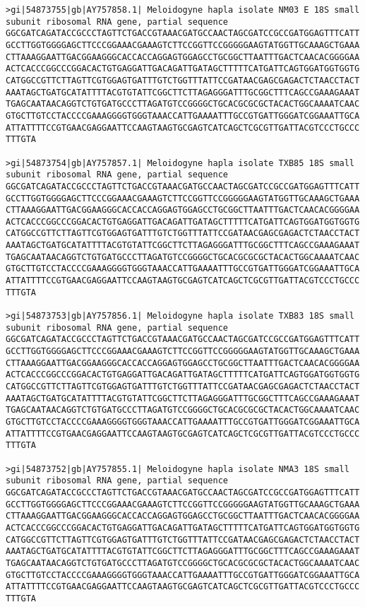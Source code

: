 \documentclass[11pt]{article}
\begin{document}
\begin{Verbatim}[commandchars=\\\{\}]
>gi|54873755|gb|AY757858.1| Meloidogyne hapla isolate NM03 E 18S small subunit ribosomal RNA gene, partial sequence
GGCGATCAGATACCGCCCTAGTTCTGACCGTAAACGATGCCAACTAGCGATCCGCCGATGGAGTTTCATT
GCCTTGGTGGGGAGCTTCCCGGAAACGAAAGTCTTCCGGTTCCGGGGGAAGTATGGTTGCAAAGCTGAAA
CTTAAAGGAATTGACGGAAGGGCACCACCAGGAGTGGAGCCTGCGGCTTAATTTGACTCAACACGGGGAA
ACTCACCCGGCCCGGACACTGTGAGGATTGACAGATTGATAGCTTTTTCATGATTCAGTGGATGGTGGTG
CATGGCCGTTCTTAGTTCGTGGAGTGATTTGTCTGGTTTATTCCGATAACGAGCGAGACTCTAACCTACT
AAATAGCTGATGCATATTTTACGTGTATTCGGCTTCTTAGAGGGATTTGCGGCTTTCAGCCGAAAGAAAT
TGAGCAATAACAGGTCTGTGATGCCCTTAGATGTCCGGGGCTGCACGCGCGCTACACTGGCAAAATCAAC
GTGCTTGTCCTACCCCGAAAGGGGTGGGTAAACCATTGAAAATTTGCCGTGATTGGGATCGGAAATTGCA
ATTATTTTCCGTGAACGAGGAATTCCAAGTAAGTGCGAGTCATCAGCTCGCGTTGATTACGTCCCTGCCC
TTTGTA

>gi|54873754|gb|AY757857.1| Meloidogyne hapla isolate TXB85 18S small subunit ribosomal RNA gene, partial sequence
GGCGATCAGATACCGCCCTAGTTCTGACCGTAAACGATGCCAACTAGCGATCCGCCGATGGAGTTTCATT
GCCTTGGTGGGGAGCTTCCCGGAAACGAAAGTCTTCCGGTTCCGGGGGAAGTATGGTTGCAAAGCTGAAA
CTTAAAGGAATTGACGGAAGGGCACCACCAGGAGTGGAGCCTGCGGCTTAATTTGACTCAACACGGGGAA
ACTCACCCGGCCCGGACACTGTGAGGATTGACAGATTGATAGCTTTTTCATGATTCAGTGGATGGTGGTG
CATGGCCGTTCTTAGTTCGTGGAGTGATTTGTCTGGTTTATTCCGATAACGAGCGAGACTCTAACCTACT
AAATAGCTGATGCATATTTTACGTGTATTCGGCTTCTTAGAGGGATTTGCGGCTTTCAGCCGAAAGAAAT
TGAGCAATAACAGGTCTGTGATGCCCTTAGATGTCCGGGGCTGCACGCGCGCTACACTGGCAAAATCAAC
GTGCTTGTCCTACCCCGAAAGGGGTGGGTAAACCATTGAAAATTTGCCGTGATTGGGATCGGAAATTGCA
ATTATTTTCCGTGAACGAGGAATTCCAAGTAAGTGCGAGTCATCAGCTCGCGTTGATTACGTCCCTGCCC
TTTGTA

>gi|54873753|gb|AY757856.1| Meloidogyne hapla isolate TXB83 18S small subunit ribosomal RNA gene, partial sequence
GGCGATCAGATACCGCCCTAGTTCTGACCGTAAACGATGCCAACTAGCGATCCGCCGATGGAGTTTCATT
GCCTTGGTGGGGAGCTTCCCGGAAACGAAAGTCTTCCGGTTCCGGGGGAAGTATGGTTGCAAAGCTGAAA
CTTAAAGGAATTGACGGAAGGGCACCACCAGGAGTGGAGCCTGCGGCTTAATTTGACTCAACACGGGGAA
ACTCACCCGGCCCGGACACTGTGAGGATTGACAGATTGATAGCTTTTTCATGATTCAGTGGATGGTGGTG
CATGGCCGTTCTTAGTTCGTGGAGTGATTTGTCTGGTTTATTCCGATAACGAGCGAGACTCTAACCTACT
AAATAGCTGATGCATATTTTACGTGTATTCGGCTTCTTAGAGGGATTTGCGGCTTTCAGCCGAAAGAAAT
TGAGCAATAACAGGTCTGTGATGCCCTTAGATGTCCGGGGCTGCACGCGCGCTACACTGGCAAAATCAAC
GTGCTTGTCCTACCCCGAAAGGGGTGGGTAAACCATTGAAAATTTGCCGTGATTGGGATCGGAAATTGCA
ATTATTTTCCGTGAACGAGGAATTCCAAGTAAGTGCGAGTCATCAGCTCGCGTTGATTACGTCCCTGCCC
TTTGTA

>gi|54873752|gb|AY757855.1| Meloidogyne hapla isolate NMA3 18S small subunit ribosomal RNA gene, partial sequence
GGCGATCAGATACCGCCCTAGTTCTGACCGTAAACGATGCCAACTAGCGATCCGCCGATGGAGTTTCATT
GCCTTGGTGGGGAGCTTCCCGGAAACGAAAGTCTTCCGGTTCCGGGGGAAGTATGGTTGCAAAGCTGAAA
CTTAAAGGAATTGACGGAAGGGCACCACCAGGAGTGGAGCCTGCGGCTTAATTTGACTCAACACGGGGAA
ACTCACCCGGCCCGGACACTGTGAGGATTGACAGATTGATAGCTTTTTCATGATTCAGTGGATGGTGGTG
CATGGCCGTTCTTAGTTCGTGGAGTGATTTGTCTGGTTTATTCCGATAACGAGCGAGACTCTAACCTACT
AAATAGCTGATGCATATTTTACGTGTATTCGGCTTCTTAGAGGGATTTGCGGCTTTCAGCCGAAAGAAAT
TGAGCAATAACAGGTCTGTGATGCCCTTAGATGTCCGGGGCTGCACGCGCGCTACACTGGCAAAATCAAC
GTGCTTGTCCTACCCCGAAAGGGGTGGGTAAACCATTGAAAATTTGCCGTGATTGGGATCGGAAATTGCA
ATTATTTTCCGTGAACGAGGAATTCCAAGTAAGTGCGAGTCATCAGCTCGCGTTGATTACGTCCCTGCCC
TTTGTA


\end{Verbatim}
\end{document}
